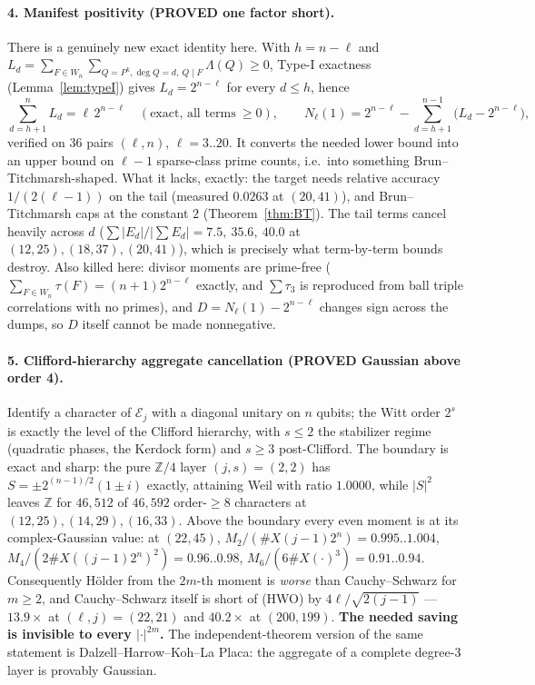 \documentclass[10pt]{article}
\theoremstyle{plain}
\theoremstyle{definition}
\newcommand{\Z}{\mathbb Z}
\newcommand{\E}{\mathcal E}
\newcommand{\Lam}{\Lambda}
\newcommand{\proved}{\textcolor{proved}{\textsf{\textbf{\footnotesize PROVED}}}}
\begin{document}
\paragraph{4. Manifest positivity (\proved{} one factor short).} There is a
genuinely new exact identity here. With $h=n-\ell$ and
$L_d=\sum_{F\in W_n}\sum_{Q=P^k,\deg Q=d,\ Q\mid F}\Lam(Q)\ge0$, Type-I
exactness (Lemma~\ref{lem:typeI}) gives $L_d=2^{n-\ell}$ for every $d\le h$,
hence
\[
 \sum_{d=h+1}^{n}L_d=\ell\,2^{n-\ell}\quad(\text{exact, all terms}\ \ge0),
 \qquad
 N_\ell(1)=2^{n-\ell}-\sum_{d=h+1}^{n-1}\bigl(L_d-2^{n-\ell}\bigr),
\]
verified on $36$ pairs $(\ell,n)$, $\ell=3..20$. It converts the needed lower
bound into an upper bound on $\ell-1$ sparse-class prime counts, i.e.\ into
something Brun--Titchmarsh-shaped. What it lacks, exactly: the target needs
relative accuracy $1/(2(\ell-1))$ on the tail (measured $0.0263$ at
$(20,41)$), and Brun--Titchmarsh caps at the constant $2$
(Theorem~\ref{thm:BT}). The tail terms cancel heavily across $d$
($\sum|E_d|/|\sum E_d|=7.5,\ 35.6,\ 40.0$ at $(12,25),(18,37),(20,41)$), which
is precisely what term-by-term bounds destroy. Also killed here: divisor
moments are prime-free ($\sum_{F\in W_n}\tau(F)=(n+1)2^{n-\ell}$ exactly, and
$\sum\tau_3$ is reproduced from ball triple correlations with no primes), and
$D=N_\ell(1)-2^{n-\ell}$ changes sign across the dumps, so $D$ itself cannot be
made nonnegative.

\paragraph{5. Clifford-hierarchy aggregate cancellation (\proved{} Gaussian
above order 4).} Identify a character of $\E_j$ with a diagonal unitary on $n$
qubits; the Witt order $2^s$ is exactly the level of the Clifford hierarchy,
with $s\le2$ the stabilizer regime (quadratic phases, the Kerdock form) and
$s\ge3$ post-Clifford. The boundary is exact and sharp: the pure $\Z/4$ layer
$(j,s)=(2,2)$ has $S=\pm2^{(n-1)/2}(1\pm i)$ exactly, attaining Weil with ratio
$1.0000$, while $|S|^2$ leaves $\Z$ for $46{,}512$ of $46{,}592$ order-$\ge8$
characters at $(12,25),(14,29),(16,33)$. Above the boundary every even moment
is at its complex-Gaussian value: at $(22,45)$,
$M_2/(\#X(j-1)2^n)=0.995..1.004$, $M_4/(2\#X((j-1)2^n)^2)=0.96..0.98$,
$M_6/(6\#X(\cdot)^3)=0.91..0.94$. Consequently H\"older from the $2m$-th moment
is \emph{worse} than Cauchy--Schwarz for $m\ge2$, and Cauchy--Schwarz itself is
short of (HWO) by $4\ell/\sqrt{2(j-1)}$ --- $13.9\times$ at $(\ell,j)=(22,21)$ and
$40.2\times$ at $(200,199)$. \textbf{The needed saving is invisible to every
$|\cdot|^{2m}$.} The independent-theorem version of the same statement is
Dalzell--Harrow--Koh--La Placa: the aggregate of a complete degree-3 layer is
provably Gaussian.
\end{document}
